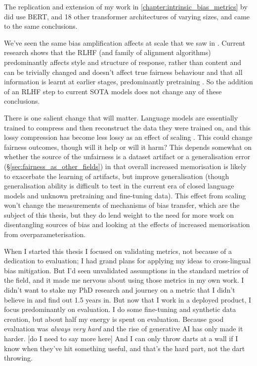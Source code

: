 The replication and extension of my work in \ref{chapter:intrinsic_bias_metrics} by \citet{cao-etal-2022-intrinsic} did use BERT, and 18 other transformer architectures of varying sizes, and came to the same conclusions. 

We've seen the same bias amplification affects at scale \citep{} that we saw in \citet{zhao-etal-2017-men}. Current research shows that the RLHF (and family of alignment algorithms) predominantly affects style and structure of response, rather than content \citep{min-etal-2022-rethinking,  lin2023unlocking} and can be trivially changed and doesn't affect true fairness behaviour \citep{qi2023finetuning} and that all information is learnt at earlier stages, predominantly pretraining \citep{zhou2023lima}.
So the addition of an RLHF step to current SOTA models does not change any of these conclusions.

There is one salient change that will matter. Language models are essentially trained to compress and then reconstruct the data they were trained on, and this lossy compression has become less lossy as an effect of scaling \citep{karamolegkou-etal-2023-copyright}. This could change fairness outcomes, though will it help or will it harm? This depends somewhat on whether the source of the unfairness is a dataset artifact or a generalisation error (\S \ref{sec:fairness_as_other_fields}) in that overall increased memorisation is likely to exacerbate the learning of artifacts, but improve generalisation (though generalisation ability is difficult to test in the current era of closed language models and unknown pretraining and fine-tuning data). This effect from scaling won't change the measurements of mechanisms of bias transfer, which are the subject of this thesis, but they do lend weight to the need for more work on disentangling sources of bias and looking at the effects of increased memorisation from overparameterisation. 

When I started this thesis I focused on validating metrics, not because of a dedication to evaluation; I had grand plans for applying my ideas to cross-lingual bias mitigation. But I'd seen unvalidated assumptions in the standard metrics of the field, and it made me nervous about using those metrics in my own work. I didn't want to stake my PhD research and journey on a metric that I didn't believe in and find out 1.5 years in. But now that I work in a deployed product, I focus predominantly on evaluation. I do some fine-tuning and synthetic data creation, but about half my energy is spent on evaluation. Because good evaluation was \textit{always very hard} and the rise of generative AI has only made it harder. [do I need to say more here] And I can only throw darts at a wall if I know when they've hit something useful, and that's the hard part, not the dart throwing. 

